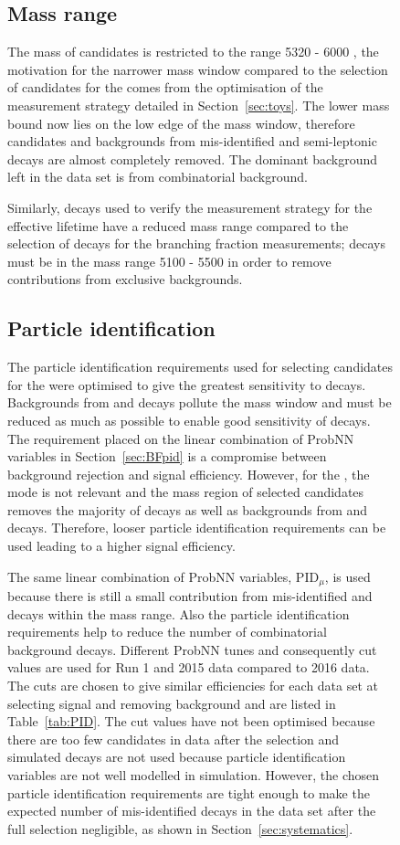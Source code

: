 \begin{figure}[tbp]
\subsection{Mass range}
\label{sec:ELmass}
The mass of \bsmumu candidates is restricted to the range 5320 - 6000 \mevcc, the motivation for the narrower mass window compared to the selection of candidates for the \BFm comes from the optimisation of the measurement strategy detailed in Section~\ref{sec:toys}. The lower mass bound now lies on the low edge of the \bs mass window, therefore \bdmumu candidates and backgrounds from mis-identified \bhh and semi-leptonic decays are almost completely removed. The dominant background left in the data set is from combinatorial background. %

Similarly, \bhh decays used to verify the measurement strategy for the \bsmumu effective lifetime have a reduced mass range compared to the selection of \bhh decays for the branching fraction measurements; \bhh decays must be in the mass range 5100 - 5500 \mevcc in order to remove contributions from exclusive backgrounds.

\subsection{Particle identification}
\label{sec:ELpid}
The particle identification requirements used for selecting candidates for the \BFm were optimised to give the greatest sensitivity to \bdmumu decays. Backgrounds from \bhh and \lambdab decays pollute the \bd mass window and must be reduced as much as possible to enable good sensitivity of \bdmumu decays. The requirement placed on the linear combination of ProbNN variables in Section~\ref{sec:BFpid} is a compromise between background rejection and signal efficiency. However, for the \elm, the \bd mode is not relevant and the mass region of selected candidates removes the majority of \bdmumu decays as well as backgrounds from \bhh and \lambdab decays. Therefore, looser particle identification requirements can be used leading to a higher signal efficiency.%

The same linear combination of ProbNN variables, PID$_{\mu}$, is used because there is still a small contribution from mis-identified \bhh and \lambdab decays within the mass range. Also the particle identification requirements help to reduce the number of combinatorial background decays. Different ProbNN tunes and consequently cut values are used for Run 1 and 2015 data compared to 2016 data. The cuts are chosen to give similar efficiencies for each data set at selecting signal and removing background and are listed in Table~\ref{tab:PID}. The cut values have not been optimised because there are too few candidates in data after the selection and simulated decays are not used because particle identification variables are not well modelled in simulation. However, the chosen particle identification requirements are tight enough to make the expected number of mis-identified decays in the data set after the full selection negligible, as shown in Section~\ref{sec:systematics}. 


\end{figure}
